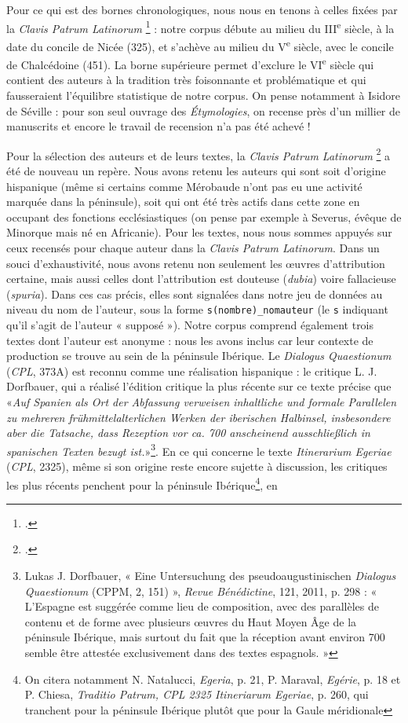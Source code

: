\documentclass[a4paper,twoside,12pt]{book}
\begin{document}
Pour ce qui est des bornes chronologiques, nous nous en tenons à celles fixées par la \textit{Clavis Patrum Latinorum} \footcite{CPL} : notre corpus débute au milieu du III\textsuperscript{e} siècle, à la date du concile de Nicée (325), et s’achève au milieu du V\textsuperscript{e} siècle, avec le concile de Chalcédoine (451). La borne supérieure permet d’exclure le VI\textsuperscript{e} siècle qui contient des auteurs à la tradition très foisonnante et problématique et qui fausseraient l’équilibre statistique de notre corpus. On pense notamment à Isidore de Séville : pour son seul ouvrage des \textit{Étymologies}, on recense près d’un millier de manuscrits et encore le travail de recension n’a pas été achevé ! 

Pour la sélection des auteurs et de leurs textes, la \textit{Clavis Patrum Latinorum} \footcite{CPL} a été de nouveau un repère. Nous avons retenu les auteurs qui sont soit d'origine hispanique (même si certains comme Mérobaude n’ont pas eu une activité marquée dans la péninsule), soit qui ont été très actifs dans cette zone en occupant des fonctions ecclésiastiques (on pense par exemple à Severus, évêque de Minorque mais né en Africanie). Pour les textes, nous nous sommes appuyés sur ceux recensés pour chaque auteur dans la \textit{Clavis Patrum Latinorum}. Dans un souci d’exhaustivité, nous avons retenu non seulement les œuvres d’attribution certaine, mais aussi celles dont l’attribution est douteuse (\textit{dubia}) voire fallacieuse (\textit{spuria}). Dans ces cas précis, elles sont signalées dans notre jeu de données au niveau du nom de l’auteur, sous la forme \texttt{s(nombre)\_nomauteur} (le \texttt{s} indiquant qu’il s’agit de l'auteur « supposé »). Notre corpus comprend également trois textes dont l'auteur est anonyme : nous les avons inclus car leur contexte de production se trouve au sein de la péninsule Ibérique. Le \textit{Dialogus Quaestionum} (\textit{CPL}, 373A) est reconnu comme une réalisation hispanique : le critique L. J. Dorfbauer, qui a réalisé l'édition critique la plus récente sur ce texte précise que «\textit{Auf Spanien als Ort der Abfassung verweisen inhaltliche und formale Parallelen zu mehreren frühmittelalterlichen Werken der iberischen Halbinsel, insbesondere aber die Tatsache, dass Rezeption vor ca. 700 anscheinend ausschlie\ss lich in spanischen Texten bezugt ist.}»\footnote{Lukas J. Dorfbauer, « Eine Untersuchung des pseudoaugustinischen \textit{Dialogus Quaestionum} (CPPM, 2, 151) », \textit{Revue Bénédictine}, 121, 2011, p. 298 : « L’Espagne est suggérée comme lieu de composition, avec des parallèles de contenu et de forme avec plusieurs œuvres du Haut Moyen Âge de la péninsule Ibérique, mais surtout du fait que la réception avant environ 700 semble être attestée exclusivement dans des textes espagnols. »}. En ce qui concerne le texte \textit{Itinerarium Egeriae} (\textit{CPL}, 2325), même si son origine reste encore sujette à discussion, les critiques les plus récents penchent pour la péninsule Ibérique\footnote{On citera notamment N. Natalucci, \textit{Egeria}, p. 21, P. Maraval, \textit{Egérie}, p. 18 et P. Chiesa, \textit{Traditio Patrum, CPL 2325 Itineriarum Egeriae}, p. 260, qui tranchent pour la péninsule Ibérique plutôt que pour la Gaule méridionale}, en 
\end{document}
